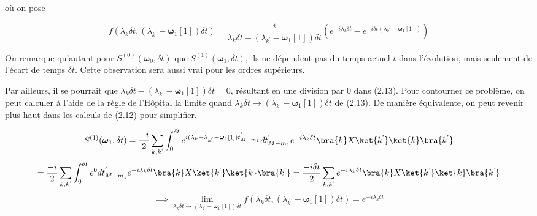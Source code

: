 où on pose

\begin{equation}
    f(\lambda_k\delta t, (\lambda_{k^\text{'}}-\boldsymbol{\omega}_1[1])\delta t) = \frac{i}{\lambda_k\delta t - (\lambda_{k^\text{'}} - \boldsymbol{\omega}_1[1])\delta t}\left(e^{-i\lambda_k\delta t} - e^{-i\delta t(\lambda_{k^\text{'}} - \boldsymbol{\omega}_1[1])} \right) 
\end{equation}

On remarque qu'autant pour $S^{(0)}(\boldsymbol{\omega}_0, \delta t)$ que $S^{(1)}(\boldsymbol{\omega}_1, \delta t)$, ils ne dépendent pas du temps actuel $t$ dans l'évolution, mais seulement de l'écart de temps $\delta t$. Cette observation sera aussi vrai pour les ordres supérieurs. 

Par ailleurs, il se pourrait que $\lambda_k\delta t - (\lambda_{k^\text{'}} - \boldsymbol{\omega}_1[1])\delta t = 0$, résultant en une division par 0 dans (2.13). Pour contourner ce problème, on peut calculer à l'aide de la règle de l'Hôpital la limite quand $\lambda_k\delta t \rightarrow (\lambda_{k^\text{'}} - \boldsymbol{\omega}_1[1])\delta t$ de (2.13). De manière équivalente, on peut revenir plus haut dans les calculs de (2.12) pour simplifier.

\begin{equation*}
    S^{(1)}(\boldsymbol{\omega}_1, \delta t) = \frac{-i}{2}\sum_{k, k^\text{'}}\int_{0}^{\delta t}e^{i(\lambda_k -\lambda_{k^{'}}+\boldsymbol{\omega}_1[1])t^{'}_{M-m_1}} dt_{M-m_1}^{'} e^{-i\lambda_k\delta t} \bra{k}X\ket{k^\text{'}}\ket{k}\bra{k^\text{'}}
\end{equation*}
\begin{equation*}
    = \frac{-i}{2}\sum_{k, k^\text{'}}\int_{0}^{\delta t}e^{0} dt_{M-m_1}^{'} e^{-i\lambda_k\delta t} \bra{k}X\ket{k^\text{'}}\ket{k}\bra{k^\text{'}} = \frac{-i \delta t}{2}\sum_{k, k^\text{'}}e^{-i\lambda_k\delta t} \bra{k}X\ket{k^\text{'}}\ket{k}\bra{k^\text{'}} 
\end{equation*}
\begin{equation*}
    \implies \lim_{\lambda_k\delta t \rightarrow (\lambda_{k^\text{'}} - \boldsymbol{\omega}_1[1])\delta t} f(\lambda_k\delta t, (\lambda_{k^\text{'}}-\boldsymbol{\omega}_1[1])\delta t) = e^{-i\lambda_k \delta t}
\end{equation*}



